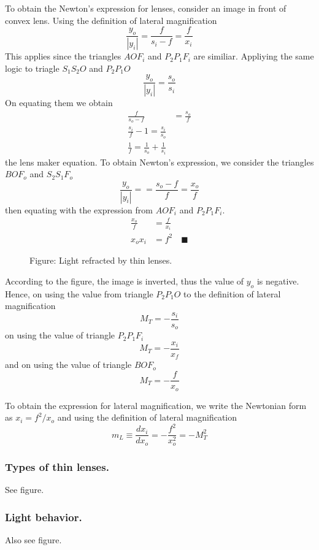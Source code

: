 \documentclass[../../../main.tex]{subfiles}
\begin{document}
To obtain the Newton's expression for lenses, consider an image in front of convex lens. Using the definition of lateral magnification 
\begin{equation*}
    \frac{y_o}{|y_i|}=\frac{f}{s_i-f}=\frac{f}{x_i}
\end{equation*}
This applies since the triangles $AOF_i$ and $P_2P_1F_i$ are similiar. Appliying the same logic to triagle $S_1S_2O$ and $P_2P_1O$
\begin{equation*}
    \frac{y_o}{|y_i|}=\frac{s_o}{s_i}
\end{equation*}
On equating them we obtain
\begin{align*}
    \frac{f}{s_o-f}&=\frac{s_o}{f}\\
    \frac{s_i}{f}-1=\frac{s_i}{s_o}\\
    \frac{1}{f}=\frac{1}{s_o}+\frac{1}{s_i}
\end{align*}
the lens maker equation. To obtain Newton's expression, we consider the triangles $BOF_o$ and $S_2S_1F_o$
\begin{equation*}
    \frac{y_o}{|y_i|}==\frac{s_o-f}{f}=\frac{x_o}{f}
\end{equation*}
then equating with the expression from $AOF_i$ and $P_2P_1F_i$.
\begin{align*}
    \frac{x_o}{f}&=\frac{f}{x_i}\\
    x_ox_i&=f^2\quad\blacksquare
\end{align*}

\begin{figure}
    \centering
    \caption*{Figure: Light refracted by thin lenses.}
\end{figure}

According to the figure, the image is inverted, thus the value of $y_o$ is negative. Hence, on using the value from triangle $P_2P_1O$ to the definition of lateral magnification
\begin{equation*}
    M_T=-\frac{s_i}{s_o}
\end{equation*}
on using the value of triangle $P_2P_1F_i$
\begin{equation*}
    M_T=-\frac{x_i}{x_f}
\end{equation*}
and on using the value of triangle $BOF_o$
\begin{equation*}
    M_T=-\frac{f}{x_o}
\end{equation*}

To obtain the expression for lateral magnification, we write the Newtonian form as $x_i=f^2/x_o$ and using the definition of lateral magnification
\begin{equation*}
    m_L\equiv\frac{dx_i}{dx_o}=-\frac{f^2}{x_o^2}=-M_T^2
\end{equation*}

\subsubsection*{Types of thin lenses.} See figure.

\subsubsection*{Light behavior.} Also see figure.
\end{document}
